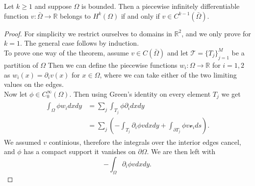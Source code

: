 
\begin{thmx}
    Let $k\geq1$ and suppose $\Omega$ is bounded. Then a piecewise infinitely differentiable function $v:\bar{\Omega}\rightarrow \mathbb{R}$
    belongs to $H^k(\Omega)$ if and only if $v\in C^{k-1}(\bar{\Omega})$.
\end{thmx}

\begin{proof}
    For simplicity we restrict ourselves to domains in $\mathbb{R}^2$, and we only prove for $k=1$. The general case follows by induction.\\ %

    To prove one way of the theorem, assume $v\in C(\bar\Omega)$ and let $\mathcal{T}={\{T_j\}}^M_{j=1}$ be a partition of $\Omega$
    Then we can define the piecewise functions $w_i:\Omega\rightarrow \mathbb{R}$ for $i=1,2$ as $w_i(x)=\partial_i v(x)$ for $x\in\Omega$, where we can take either of the two limiting values on the edges. %
    \\
    Now let $\phi\in C^{\infty}_0 (\Omega)$. Then using Green's identity on every element $T_j$ we get
    \begin{align}
    \begin{split}
        \int_\Omega \phi w_i dxdy &= \sum_j\int_{T_j} \phi \partial_i dx dy \\
        &= \sum_j \left( -\int_{T_j} \partial_i \phi v dxdy + \int_{\partial T_j} \phi v \mathcal{v}_i ds\right).
    \end{split}
    \end{align}
    We assumed $v$ continious, therefore the integrals over the interior edges cancel, and $\phi$ has a compact support it vanishes on $\partial \Omega$. We are then left with
    \begin{equation}
        -\int_\Omega \partial_i \phi v dxdy.
    \end{equation}
\end{proof}